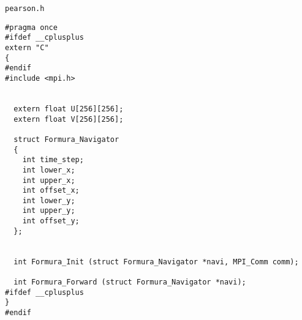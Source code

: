 \verb`pearson.h`
\begin{breakbox}
\begin{verbatim}
#pragma once
#ifdef __cplusplus
extern "C"
{
#endif
#include <mpi.h>


  extern float U[256][256];
  extern float V[256][256];

  struct Formura_Navigator
  {
    int time_step;
    int lower_x;
    int upper_x;
    int offset_x;
    int lower_y;
    int upper_y;
    int offset_y;
  };


  int Formura_Init (struct Formura_Navigator *navi, MPI_Comm comm);

  int Formura_Forward (struct Formura_Navigator *navi);
#ifdef __cplusplus
}
#endif
\end{verbatim}
\end{breakbox}


